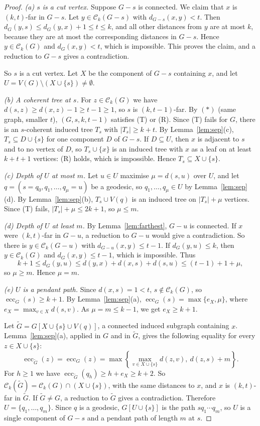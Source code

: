 \documentclass[11pt,a4paper]{article}
\theoremstyle{remark}
\newcommand{\ecc}{\operatorname{ecc}}
\newcommand{\C}{\mathcal C}
\begin{document}
\begin{proof}
\emph{(a) $s$ is a cut vertex.} Suppose $G-s$ is connected. We claim that $x$ is $(k,t)$-far in $G-s$. Let $y\in\C_k(G-s)$ with $d_{G-s}(x,y)<t$. Then $d_G(y,s)\le d_G(y,x)+1\le t\le k$, and all other distances from $y$ are at most $k$, because they are at most the corresponding distances in $G-s$. Hence $y\in\C_k(G)$ and $d_G(x,y)<t$, which is impossible. This proves the claim, and a reduction to $G-s$ gives a contradiction.

So $s$ is a cut vertex. Let $X$ be the component of $G-s$ containing $x$, and let $U=V(G)\setminus(X\cup\{s\})\ne\emptyset$.

\emph{(b) A coherent tree at $s$.} For $z\in\C_k(G)$ we have $d(s,z)\ge d(x,z)-1\ge t-1\ge1$, so $s$ is $(k,t-1)$-far. By $(\ast)$ (same graph, smaller $t$), $(G,s,k,t-1)$ satisfies (T) or (R). Since (T) fails for $G$, there is an $s$-coherent induced tree $T_s$ with $|T_s|\ge k+t$. By Lemma~\ref{lem:sep}(c), $T_s\subseteq D\cup\{s\}$ for one component $D$ of $G-s$. If $D\subseteq U$, then $x$ is adjacent to $s$ and to no vertex of $D$, so $T_s\cup\{x\}$ is an induced tree with $x$ as a leaf on at least $k+t+1$ vertices: (R) holds, which is impossible. Hence $T_s\subseteq X\cup\{s\}$.

\emph{(c) Depth of $U$ at most $m$.} Let $u\in U$ maximise $\mu=d(s,u)$ over $U$, and let $q=(s=q_0,q_1,\dots,q_\mu=u)$ be a geodesic, so $q_1,\dots,q_\mu\in U$ by Lemma~\ref{lem:sep}(d). By Lemma~\ref{lem:sep}(b), $T_s\cup V(q)$ is an induced tree on $|T_s|+\mu$ vertices. Since (T) fails, $|T_s|+\mu\le 2k+1$, so $\mu\le m$.

\emph{(d) Depth of $U$ at least $m$.} By Lemma~\ref{lem:farthest}, $G-u$ is connected. If $x$ were $(k,t)$-far in $G-u$, a reduction to $G-u$ would give a contradiction. So there is $y\in\C_k(G-u)$ with $d_{G-u}(x,y)\le t-1$. If $d_G(y,u)\le k$, then $y\in\C_k(G)$ and $d_G(x,y)\le t-1$, which is impossible. Thus
\[
k+1\le d_G(y,u)\le d(y,x)+d(x,s)+d(s,u)\le (t-1)+1+\mu ,
\]
so $\mu\ge m$. Hence $\mu=m$.

\emph{(e) $U$ is a pendant path.} Since $d(x,s)=1<t$, $s\notin\C_k(G)$, so $\ecc_G(s)\ge k+1$. By Lemma~\ref{lem:sep}(a), $\ecc_G(s)=\max\{e_X,\mu\}$, where $e_X=\max_{v\in X}d(s,v)$. As $\mu=m\le k-1$, we get $e_X\ge k+1$.

Let $\tilde G=G[X\cup\{s\}\cup V(q)]$, a connected induced subgraph containing $x$. Lemma~\ref{lem:sep}(a), applied in $G$ and in $\tilde G$, gives the following equality for every $z\in X\cup\{s\}$:\[\ecc_{\tilde G}(z)=\ecc_G(z)=\max\left\{\max_{v\in X\cup\{s\}}d(z,v),\ d(z,s)+m\right\}.\] For $h\ge1$ we have $\ecc_{\tilde G}(q_h)\ge h+e_X\ge k+2$. So $\C_k(\tilde G)=\C_k(G)\cap(X\cup\{s\})$, with the same distances to $x$, and $x$ is $(k,t)$-far in $\tilde G$. If $\tilde G\ne G$, a reduction to $\tilde G$ gives a contradiction. Therefore $U=\{q_1,\dots,q_m\}$. Since $q$ is a geodesic, $G[U\cup\{s\}]$ is the path $sq_1\cdots q_m$, so $U$ is a single component of $G-s$ and a pendant path of length $m$ at $s$.
\end{proof}
\end{document}
